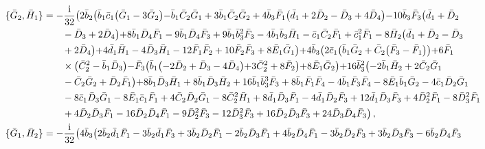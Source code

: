 \documentclass[10pt]{amsart}
\theoremstyle{definition}
\theoremstyle{corollary}
\theoremstyle{remark}
\theoremstyle{conclusion}
\begin{document}
\begin{align}
\{\bar{G}_2, \bar{H}_1\}&=-\frac{{\rm i}}{32} \bigl(2 \bar{b}_2 \bigl(\bar{b}_1 \bar{c}_1 \bigl(\bar{G}_1-3 \bar{G}_2\bigl)-\bar{b}_1 \bar{C}_2 \bar{G}_1+3 \bar{b}_1 \bar{C}_2 \bar{G}_2+4 \bar{b}_3 \bar{F}_1 \bigl(\bar{d}_1+2 \bar{D}_2-\bar{D}_3+4 \bar{D}_4\bigl)-10 \bar{b}_3 \bar{F}_3 \bigl(\bar{d}_1+\bar{D}_2\nonumber \\
& \hskip 0.7cm-\bar{D}_3+2 \bar{D}_4\bigl)+8 \bar{b}_1 \bar{D}_4 \bar{F}_1-9 \bar{b}_1 \bar{D}_4 \bar{F}_3+9 \bar{b}_1 \bar{b}_3^2 \bar{F}_3-4 \bar{b}_1 \bar{b}_3 \bar{H}_1-\bar{c}_1 \bar{C}_2 \bar{F}_1+\bar{c}_1^2 \bar{F}_1-8 \bar{H}_2 \bigl(\bar{d}_1+\bar{D}_2-\bar{D}_3\nonumber \\
& \hskip 0.7cm+2 \bar{D}_4\bigl)+4 \bar{d}_1 \bar{H}_1-4 \bar{D}_3 \bar{H}_1-12 \bar{F}_1 \bar{F}_2+10 \bar{F}_2 \bar{F}_3+8 \bar{E}_1 \bar{G}_1\bigl)+4 \bar{b}_3 \bigl(2 \bar{c}_1 \bigl(\bar{b}_1 \bar{G}_2+\bar{C}_2 \bigl(\bar{F}_3-\bar{F}_1\bigl)\bigl)+6 \bar{F}_1\nonumber \\
& \hskip 0.7cm \times \bigl(\bar{C}_2^2-\bar{b}_1 \bar{D}_3\bigl)-\bar{F}_3 \bigl(\bar{b}_1 \bigl(-2 \bar{D}_2+\bar{D}_3-4 \bar{D}_4\bigl)+3 \bar{C}_2^2+8 \bar{F}_2\bigl)+8 \bar{E}_1 \bar{G}_2\bigl)+16 \bar{b}_3^2 \bigl(-2 \bar{b}_1 \bar{H}_2+2 \bar{C}_2 \bar{G}_1\nonumber \\
& \hskip 0.7cm -\bar{C}_2 \bar{G}_2+\bar{D}_2 \bar{F}_1\bigl)+8 \bar{b}_1 \bar{D}_3 \bar{H}_1+8 \bar{b}_1 \bar{D}_3 \bar{H}_2+16 \bar{b}_1 \bar{b}_3^3 \bar{F}_3+8 \bar{b}_1 \bar{F}_1 \bar{F}_4-4 \bar{b}_1 \bar{F}_3 \bar{F}_4-8 \bar{E}_1 \bar{b}_1 \bar{G}_2-4 \bar{c}_1 \bar{D}_2 \bar{G}_1\nonumber \\
& \hskip 0.7cm -8 \bar{c}_1 \bar{D}_3 \bar{G}_1-8 \bar{E}_1 \bar{c}_1 \bar{F}_1+4 \bar{C}_2 \bar{D}_2 \bar{G}_1-8 \bar{C}_2^2 \bar{H}_1+8 \bar{d}_1 \bar{D}_3 \bar{F}_1-4 \bar{d}_1 \bar{D}_2 \bar{F}_3+12 \bar{d}_1 \bar{D}_3 \bar{F}_3+4 \bar{D}_2^2 \bar{F}_1-8 \bar{D}_3^2 \bar{F}_1\nonumber \\
& \hskip 0.7cm +4 \bar{D}_2 \bar{D}_3 \bar{F}_1-16 \bar{D}_2 \bar{D}_4 \bar{F}_1-9 \bar{D}_2^2 \bar{F}_3-12 \bar{D}_3^2 \bar{F}_3+16 \bar{D}_2 \bar{D}_3 \bar{F}_3+24 \bar{D}_3 \bar{D}_4 \bar{F}_3\bigl) \, , \nonumber \\
\{\bar{G}_1, \bar{H}_2\}&=-\frac{\rm i}{32} \bigl(4 \bar{b}_3 \bigl(2 \bar{b}_2 \bar{d}_1 \bar{F}_1-3 \bar{b}_2 \bar{d}_1 \bar{F}_3+3 \bar{b}_2 \bar{D}_2 \bar{F}_1-2 \bar{b}_2 \bar{D}_3 \bar{F}_1+4 \bar{b}_2 \bar{D}_4 \bar{F}_1-3 \bar{b}_2 \bar{D}_2 \bar{F}_3+3 \bar{b}_2 \bar{D}_3 \bar{F}_3-6 \bar{b}_2 \bar{D}_4 \bar{F}_3\nonumber \\

\end{align}
\end{document}
